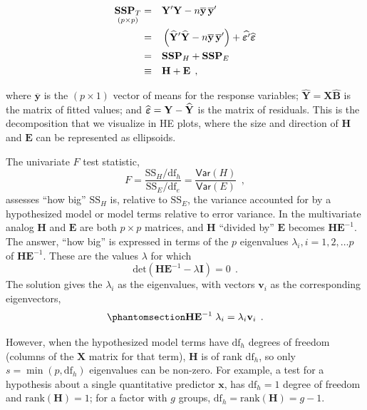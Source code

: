 \documentclass[
  letterpaper,
  10pt,
  krantz2]{krantz}
\begin{document}
\begin{eqnarray*}
\underset{(p\times p)}{\mathbf{SSP}_{T}}
& = && \mathbf{Y}^{\prime} \mathbf{Y} - n \overline{\mathbf{y}}\,\overline{\mathbf{y}}^{\prime} \\
& = && \left(\widehat {\mathbf{Y}}^{\prime}\widehat{\mathbf{Y}} - n\overline{\mathbf{y}}\,\overline{\mathbf{y}}^{\prime} \right) + \widehat{\boldsymbol{\Large\varepsilon}^{\prime}}\widehat{\boldsymbol{\Large\varepsilon}} \\
& = &&  \mathbf{SSP}_{H} + \mathbf{SSP}_{E} \\
& \equiv && \mathbf{H} + \mathbf{E} \:\: ,
\end{eqnarray*}

where \(\overline{\mathbf{y}}\) is the \((p\times 1)\) vector of means
for the response variables;
\(\widehat{\mathbf{Y}} = \mathbf{X}\widehat{\mathbf{B}}\) is the matrix
of fitted values; and
\(\widehat{\boldsymbol{\Large\varepsilon}} = \mathbf{Y} -\widehat{\mathbf{Y}}\)
is the matrix of residuals. This is the decomposition that we visualize
in HE plots, where the size and direction of \(\mathbf{H}\) and
\(\mathbf{E}\) can be represented as ellipsoids.

The univariate \(F\) test statistic,
\[F = \frac{\text{SS}_H/\text{df}_h}{\text{SS}_E/\text{df}_e} = \frac{\mathsf{Var}(H)}{\mathsf{Var}(E)} \:\: ,
\] assesses ``how big'' \(\text{SS}_H\) is, relative to \(\text{SS}_E\),
the variance accounted for by a hypothesized model or model terms
relative to error variance. In the multivariate analog \(\mathbf{H}\)
and \(\mathbf{E}\) are both \(p \times p\) matrices, and \(\mathbf{H}\)
``divided by'' \(\mathbf{E}\) becomes \(\mathbf{H}\mathbf{E}^{-1}\). The
answer, ``how big'' is expressed in terms of the \(p\) eigenvalues
\(\lambda_i, i = 1, 2, \dots p\) of \(\mathbf{H}\mathbf{E}^{-1}\). These
are the values \(\lambda\) for which \[
\mathrm{det}(\mathbf{H}\mathbf{E}^{-1} - \lambda \mathbf{I}) = 0 \:\: .
\] The solution gives the \(\lambda_i\) as the eigenvalues, with vectors
\(\mathbf{v}_i\) as the corresponding eigenvectors,
\begin{equation}\phantomsection\label{eq-he-eigen}{
\mathbf{H}\mathbf{E}^{-1} \; \lambda_i = \lambda_i \mathbf{v}_i \:\: .
}\end{equation}

However, when the hypothesized model terms have \(\text{df}_h\) degrees
of freedom (columns of the \(\mathbf{X}\) matrix for that term),
\(\mathbf{H}\) is of rank \(\text{df}_h\), so only
\(s=\min(p, \text{df}_h)\) eigenvalues can be non-zero. For example, a
test for a hypothesis about a single quantitative predictor
\(\mathbf{x}\), has \(\text{df}_h = 1\) degree of freedom and
\(\mathrm{rank} (\mathbf{H}) = 1\); for a factor with \(g\) groups,
\(\text{df}_h = \mathrm{rank} (\mathbf{H}) = g-1\).
\end{document}
